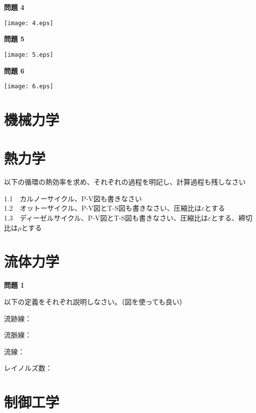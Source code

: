\documentclass[
	a4paper, %
	12pt, %
]{CSSullivanBusinessReport}
\begin{document}
\begin{fullwidth}
\textbf{問題 4}

\begin{center}
	\centering 
  \texttt{[image: 4.eps]} 
  \label{fig:2}
\end{center}

\textbf{問題 5}

\begin{center}
	\centering 
  \texttt{[image: 5.eps]} 
  \label{fig:2}
\end{center}


\textbf{問題 6}

\begin{center}
	\centering 
  \texttt{[image: 6.eps]} 
  \label{fig:2}
\end{center}





\section{機械力学}



\newpage
\section{熱力学}

以下の循環の熱効率を求め、それぞれの過程を明記し、計算過程も残しなさい


1.1　カルノーサイクル、P-V図も書きなさい
\\[200pt]
1.2　オットーサイクル、P-V図とT-S図も書きなさい、圧縮比は$ \varepsilon $とする
\\[200pt]
1.3　ディーゼルサイクル、P-V図とT-S図も書きなさい、圧縮比は$ \varepsilon $とする、締切比は$ \rho $とする
\\[200pt]
\section{流体力学}
\textbf{問題 1}

以下の定義をそれぞれ説明しなさい。（図を使っても良い）

流跡線：

流脈線：

流線：

レイノルズ数：


\section{制御工学}





\end{fullwidth}
\end{document}
